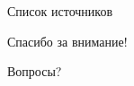 \documentclass[aspectratio=169, 10pt]{beamer}
\begin{document}




		

	\begin{frame}{Список источников}
		\renewcommand{\section}[2]{}%
	  
	  
	\end{frame}

	\begin{frame}[standout]%
		Спасибо за внимание!

		Вопросы?
	\end{frame}
\end{document}
